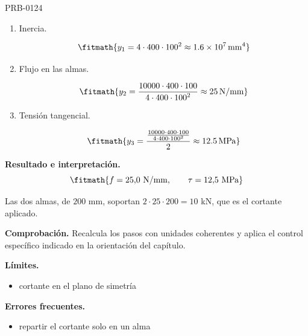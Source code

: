 \begin{studiumworked}{PRB-0124}
\begin{enumerate}
\item Inercia.

\[\fitmath{y_{1}=4\cdot 400\cdot {100}^{2}\approx 1.6\times10^{7}\,\mathrm{mm^{4}}}\]

\item Flujo en las almas.

\[\fitmath{y_{2}=\frac{10000\cdot 400\cdot 100}{4\cdot 400\cdot {100}^{2}}\approx 25\,\mathrm{N/mm}}\]

\item Tensión tangencial.

\[\fitmath{y_{3}=\frac{\frac{10000\cdot 400\cdot 100}{4\cdot 400\cdot {100}^{2}}}{2}\approx 12.5\,\mathrm{MPa}}\]

\end{enumerate}

\textbf{Resultado e interpretación.}\[\fitmath{f = 25{,}0\ \mathrm{N/mm},\qquad \tau = 12{,}5\ \mathrm{MPa}}\]

Las dos almas, de $200$ mm, soportan $2\cdot 25\cdot 200 = 10$ kN, que es el cortante aplicado.

\par\textbf{Comprobación.} Recalcula los pasos con unidades coherentes y aplica el control específico indicado en la orientación del capítulo.

\textbf{Límites.}\begin{itemize}\item cortante en el plano de simetría\end{itemize}

\textbf{Errores frecuentes.}\begin{itemize}\item repartir el cortante solo en un alma\end{itemize}

\end{studiumworked}

\Needspace{.3\textheight}

